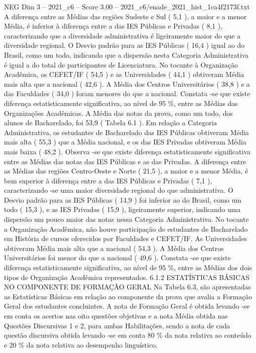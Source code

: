 \begin{textsample}{NEG Dim 3 – 2021\_c6 – Score 3.00 – 2021\_c6/enade\_2021\_hist\_1ca4f2173f.txt}
A diferença entre as Médias das regiões Sudeste e Sul ( 5,1 ), a maior e a menor Média, é inferior à diferença entre a das IES Públicas e Privadas ( 8,1 ), caracterizando que a diversidade administrativa é ligeiramente maior do que a diversidade regional.
O Desvio padrão para as IES Públicas ( 16,4 ) igual ao do Brasil, como um todo, indicando que a dispersão nesta Categoria Administrativa é igual a do total de participantes de Licenciatura.
No tocante à Organização Acadêmica, os CEFET/IF ( 54,5 ) e as Universidades ( 44,1 ) obtiveram Média mais alta que a nacional ( 42,6 ).
A Média dos Centros Universitários ( 38,8 ) e a das Faculdades ( 34,0 ) foram menores do que a nacional.
Constata -se que existe diferença estatisticamente significativa, ao nível de 95 \%, entre as Médias das Organizações Acadêmicas.
A Média das notas da prova, como um todo, dos alunos de Bacharelado, foi 53,9 ( Tabela 6.1 ).
Em relação a Categoria Administrativa, os estudantes de Bacharelado das IES Públicas obtiveram Média mais alta ( 55,3 ) que a Média nacional, e os das IES Privadas obtiveram Média mais baixa ( 48,2 ).
Observa -se que existe diferença estatisticamente significativa entre as Médias das notas das IES Públicas e as das Privadas.
A diferença entre as Médias das regiões Centro-Oeste e Norte ( 21,5 ), a maior e a menor Média, é bem superior à diferença entre a das IES Públicas e Privadas ( 7,1 ), caracterizando -se uma maior diversidade regional do que administrativa.
O Desvio padrão para as IES Públicas ( 14,9 ) foi inferior ao do Brasil, como um todo ( 15,3 ), e as IES Privadas ( 15,9 ), ligeiramente superior, indicando uma dispersão um pouco maior das notas nessa Categoria Administrativa.
No tocante a Organização Acadêmica, não houve participação de estudantes de Bacharelado em História de cursos oferecidos por Faculdades e CEFET/IF.
As Universidades obtiveram Média mais alta que a nacional ( 54,3 ).
A Média dos Centros Universitários foi menor do que a nacional ( 49,6 ).
Constata -se que existe diferença estatisticamente significativa, ao nível de 95 \%, entre as Médias dos dois tipos de Organização Acadêmica representados. 6.1.2 ESTATÍSTICAS BÁSICAS NO COMPONENTE DE FORMAÇÃO GERAL Na Tabela 6.3, são apresentadas as Estatísticas Básicas em relação ao componente da prova que avalia a Formação Geral dos estudantes concluintes.
A nota de Formação Geral é obtida levando -se em conta os acertos nas oito questões objetivas e a nota Média obtida nas Questões Discursivas 1 e 2, para ambas Habilitações, sendo a nota de cada questão discursiva obtida levando -se em conta 80 \% da nota relativa ao conteúdo e 20 \% da nota relativa ao desempenho linguístico.

\end{textsample}
